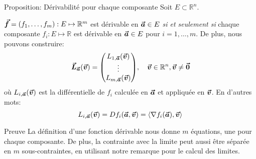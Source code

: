 \documentclass[a4paper]{article}
\begin{document}
\begin{parag}{Proposition: Dérivabilité pour chaque composante}
    Soit $E \subset \mathbb{R}^n$.

    $\bvec{f} = \left(f_1, \ldots, f_m\right): E \mapsto \mathbb{R}^m$ est dérivable en $\bm{\protect\vec{a}} \in E$ \textit{si et seulement si} chaque composante $f_i : E \mapsto \mathbb{R}$ est dérivable en $\bm{\protect\vec{a}} \in E$ pour $i = 1, \ldots, m$. De plus, nous pouvons construire: 
    \[\bvec{L}_{\bvec{a}}\left(\bvec{v}\right) = \begin{pmatrix} L_{1, \bvec{a}}\left(\bvec{v}\right) \\ \vdots \\ L_{m, \bvec{a}}\left(\bvec{v}\right) \end{pmatrix}, \mathspace \bvec{v} \in \mathbb{R}^n, \bvec{v} \neq \bvec{0}\]
    où $L_{i, \bvec{a}}\left(\bvec{v}\right)$ est la différentielle de $f_i$ calculée en $\bm{\protect\vec{a}}$ et appliquée en $\bm{\protect\vec{v}}$. En d'autres mots: 
    \[L_{i, \bvec{a}}\left(\bvec{v}\right) = D f_i\left(\bvec{a}, \bvec{v}\right) = \left<\nabla f_i\left(\bvec{a}\right), \bvec{v}\right>\]

    \begin{subparag}{Preuve}
        La définition d'une fonction dérivable nous donne $m$ équations, une pour chaque composante. De plus, la contrainte avec la limite peut aussi être séparée en $m$ sous-contraintes, en utilisant notre remarque pour le calcul des limites.
    \end{subparag}
\end{parag}
\end{document}
